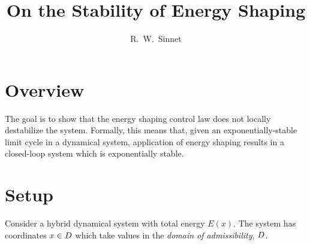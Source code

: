 \documentclass[twocolumn]{article}
\author{R.~W.~Sinnet}
\title{On the Stability of Energy Shaping}
\begin{document}
\maketitle
\thispagestyle{fancy}

\section*{Overview}
The goal is to show that the energy shaping control law does not locally destabilize the system.
%
Formally, this means that, given an exponentially-stable limit cycle in a dynamical system, application of energy shaping results in a closed-loop system which is exponentially stable.

\section{Setup}

Consider a hybrid dynamical system with total energy $E(x)$.
%
The system has coordinates $x \in D$ which take values in the {\em domain of admissibility}, $D$.
\end{document}
